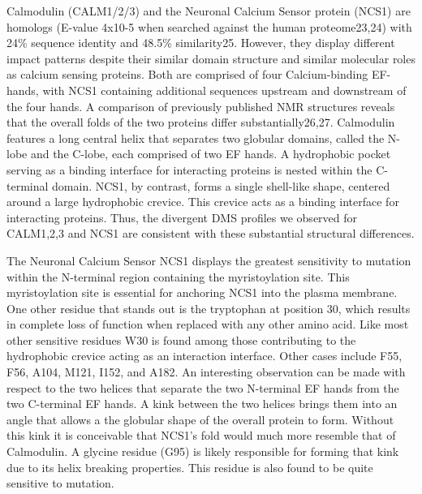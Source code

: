 Calmodulin (CALM1/2/3) and the Neuronal Calcium Sensor protein (NCS1) are homologs (E-value 4x10-5 when searched against the human proteome23,24) with 24\% sequence identity and 48.5\% similarity25. However, they display different impact patterns despite their similar domain structure and similar molecular roles as calcium sensing proteins. Both are comprised of four Calcium-binding EF-hands, with NCS1 containing additional sequences upstream and downstream of the four hands. A comparison of previously published NMR structures reveals that the overall folds of the two proteins differ substantially26,27. Calmodulin features a long central helix that separates two globular domains, called the N-lobe and the C-lobe, each comprised of two EF hands. A hydrophobic pocket serving as a binding interface for interacting proteins is nested within the C-terminal domain. NCS1, by contrast, forms a single shell-like shape, centered around a large hydrophobic crevice. This crevice acts as a binding interface for interacting proteins. Thus, the divergent DMS profiles we observed for CALM1,2,3 and NCS1 are consistent with these substantial structural differences.

The Neuronal Calcium Sensor NCS1 displays the greatest sensitivity to mutation within the N-terminal region containing the myristoylation site.  This myristoylation site is essential for anchoring NCS1 into the plasma membrane. One other residue that stands out is the tryptophan at position 30, which results in complete loss of function when replaced with any other amino acid. Like most other sensitive residues W30 is found among those contributing to the hydrophobic crevice acting as an interaction interface. Other cases include F55, F56, A104, M121, I152, and A182. An interesting observation can be made with respect to the two helices that separate the two N-terminal EF hands from the two C-terminal EF hands. A kink between the two helices brings them into an angle that allows a the globular shape of the overall protein to form. Without this kink it is conceivable that NCS1’s fold would much more resemble that of Calmodulin. A glycine residue (G95) is likely responsible for forming that kink due to its helix breaking properties. This residue is also found to be quite sensitive to mutation.

